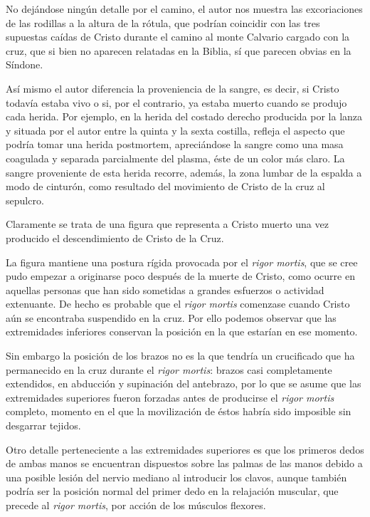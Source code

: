 No dejándose ningún detalle por el camino, el autor nos muestra las excoriaciones de las rodillas a la altura de la rótula, que podrían coincidir con las tres supuestas caídas de Cristo durante el camino al monte Calvario cargado con la cruz, que si bien no aparecen relatadas en la Biblia, sí que parecen obvias en la Síndone.

Así mismo el autor diferencia la proveniencia de la sangre, es decir, si Cristo todavía estaba vivo o si, por el contrario, ya estaba muerto cuando se produjo cada herida. Por ejemplo, en la herida del costado derecho producida por la lanza y situada por el autor entre la quinta y la sexta costilla, refleja el aspecto que podría tomar una herida postmortem, apreciándose la sangre como una masa coagulada y separada parcialmente del plasma, éste de un color más claro. La sangre proveniente de esta herida recorre, además, la zona lumbar de la espalda a modo de cinturón, como resultado del movimiento de Cristo de la cruz al sepulcro.

Claramente se trata de una figura que representa a Cristo muerto una vez producido el descendimiento de Cristo de la Cruz.

La figura mantiene una postura rígida provocada por el \textit{rigor mortis}, que se cree pudo empezar a originarse poco después de la muerte de Cristo, como ocurre en aquellas personas que han sido sometidas a grandes esfuerzos o actividad extenuante. De hecho es probable que el \textit{rigor mortis} comenzase cuando Cristo aún se encontraba suspendido en la cruz. Por ello podemos observar que las extremidades inferiores conservan la posición en la que estarían en ese momento.

Sin embargo la posición de los brazos no es la que tendría un crucificado que ha permanecido en la cruz durante el \textit{rigor mortis}: brazos casi completamente extendidos, en abducción y supinación del antebrazo, por lo que se asume que las extremidades superiores fueron forzadas antes de producirse el \textit{rigor mortis} completo, momento en el que la movilización de éstos habría sido imposible sin desgarrar tejidos. 

Otro detalle perteneciente a las extremidades superiores es que los primeros dedos de ambas manos se encuentran dispuestos sobre las palmas de las manos debido a una posible lesión del nervio mediano al introducir los clavos, aunque también podría ser la posición normal del primer dedo en la relajación muscular, que precede al \textit{rigor mortis}, por acción de los músculos flexores.

